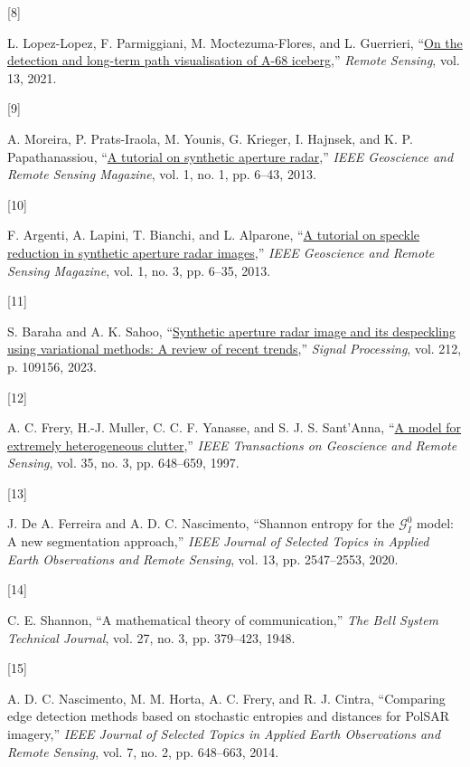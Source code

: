 \documentclass[
  lettersize  journal,
]{IEEEtran}%
\newlength{\cslhangindent}
\newlength{\csllabelwidth}
\newenvironment{CSLReferences}[2] %
 {\begin{list}{}{%
  \setlength{\itemindent}{0pt}
  \setlength{\leftmargin}{0pt}
  \setlength{\parsep}{0pt}
  \ifodd #1
   \setlength{\leftmargin}{\cslhangindent}
   \setlength{\itemindent}{-1\cslhangindent}
  \fi
  \setlength{\itemsep}{#2\baselineskip}}}
 {\end{list}}
\newcommand{\CSLLeftMargin}[1]{\parbox[t]{\csllabelwidth}{\strut#1\strut}}
\newcommand{\CSLRightInline}[1]{\parbox[t]{\linewidth - \csllabelwidth}{\strut#1\strut}}
\begin{document}
\begin{CSLReferences}{0}{0}
\CSLLeftMargin{{[}8{]} }%
\CSLRightInline{L. Lopez-Lopez, F. Parmiggiani, M. Moctezuma-Flores, and
L. Guerrieri, {``\href{https://doi.org/10.3390/rs13030460}{On the
detection and long-term path visualisation of {A}-68 iceberg},''}
\emph{Remote Sensing}, vol. 13, 2021. }

\CSLLeftMargin{{[}9{]} }%
\CSLRightInline{A. Moreira, P. Prats-Iraola, M. Younis, G. Krieger, I.
Hajnsek, and K. P. Papathanassiou,
{``\href{https://doi.org/10.1109/mgrs.2013.2248301}{A tutorial on
synthetic aperture radar},''} \emph{IEEE Geoscience and Remote Sensing
Magazine}, vol. 1, no. 1, pp. 6--43, 2013. }

\CSLLeftMargin{{[}10{]} }%
\CSLRightInline{F. Argenti, A. Lapini, T. Bianchi, and L. Alparone,
{``\href{https://doi.org/10.1109/mgrs.2013.2277512}{A tutorial on
speckle reduction in synthetic aperture radar images},''} \emph{IEEE
Geoscience and Remote Sensing Magazine}, vol. 1, no. 3, pp. 6--35, 2013.
}

\CSLLeftMargin{{[}11{]} }%
\CSLRightInline{S. Baraha and A. K. Sahoo,
{``\href{https://doi.org/10.1016/j.sigpro.2023.109156}{Synthetic
aperture radar image and its despeckling using variational methods: A
review of recent trends},''} \emph{Signal Processing}, vol. 212, p.
109156, 2023. }

\CSLLeftMargin{{[}12{]} }%
\CSLRightInline{A. C. Frery, H.-J. Muller, C. C. F. Yanasse, and S. J.
S. Sant'Anna, {``\href{https://doi.org/10.1109/36.581981}{A model for
extremely heterogeneous clutter},''} \emph{{IEEE} Transactions on
Geoscience and Remote Sensing}, vol. 35, no. 3, pp. 648--659, 1997. }

\CSLLeftMargin{{[}13{]} }%
\CSLRightInline{J. De A. Ferreira and A. D. C. Nascimento, {``Shannon
entropy for the {\(\mathcal {G}^0_{I}\)} model: A new segmentation
approach,''} \emph{{IEEE} Journal of Selected Topics in Applied Earth
Observations and Remote Sensing}, vol. 13, pp. 2547--2553, 2020. }

\CSLLeftMargin{{[}14{]} }%
\CSLRightInline{C. E. Shannon, {``A mathematical theory of
communication,''} \emph{The Bell System Technical Journal}, vol. 27, no.
3, pp. 379--423, 1948. }

\CSLLeftMargin{{[}15{]} }%
\CSLRightInline{A. D. C. Nascimento, M. M. Horta, A. C. Frery, and R. J.
Cintra, {``Comparing edge detection methods based on stochastic
entropies and distances for {PolSAR} imagery,''} \emph{{IEEE} Journal of
Selected Topics in Applied Earth Observations and Remote Sensing}, vol.
7, no. 2, pp. 648--663, 2014. }


\end{CSLReferences}
\end{document}
